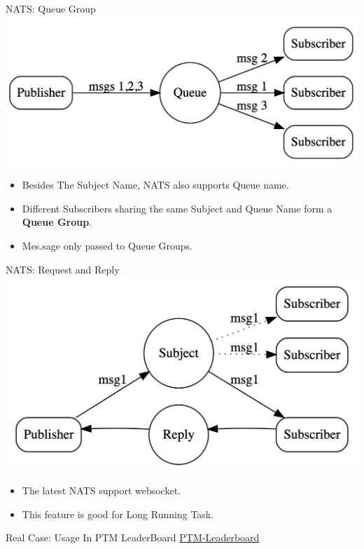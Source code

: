 \documentclass{beamer}
\begin{document}
\begin{frame}{NATS: Queue Group}
    \includegraphics[width=\textwidth]{assets/MessageQueue.png}
    \begin{itemize}
        \item Besides The Subject Name, NATS also supports Queue name.
        \item Different Subscribers sharing the same Subject and Queue Name form a \textbf{Queue Group}.
        \item Mes.sage only passed to Queue Groups.
    \end{itemize}
\end{frame}

\begin{frame}{NATS: Request and Reply}
    \includegraphics[width=\textwidth]{assets/Req.png}
    \begin{itemize}
        \item The latest NATS support websocket.
        \item This feature is good for Long Running Task.
    \end{itemize}
\end{frame}

\begin{frame}{Real Case: Usage In PTM LeaderBoard}
    \href{http://localhost:3000}{PTM-Leaderboard}
\end{frame}
\end{document}
